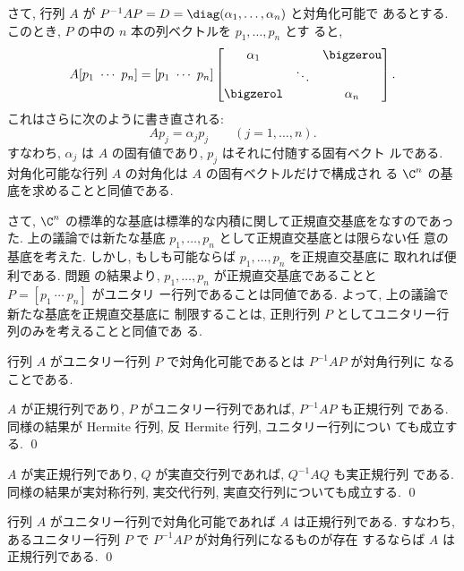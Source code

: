 \documentclass[12pt,twoside]{jarticle}
\begin{document}
さて, 行列 $A$ が $P^{-1}AP=D=\diag(\alpha_1,\dots,\alpha_n)$ と対角化可能で
あるとする.  このとき, $P$ の中の $n$ 本の列ベクトルを $p_1,\dots,p_n$ とす
ると, 
\begin{equation*}
  A [p_1\ \cdots\ p_n] = 
  [p_1\ \cdots\ p_n]
  \begin{bmatrix}
    \alpha_1  &        & \bigzerou \\
              & \ddots &           \\
    \bigzerol &        & \alpha_n  \\
  \end{bmatrix}.
\end{equation*}
これはさらに次のように書き直される:
\begin{equation*}
  A p_j = \alpha_j p_j \qquad (j=1,\dots,n).
\end{equation*}
すなわち, $\alpha_j$ は $A$ の固有値であり, $p_j$ はそれに付随する固有ベクト
ルである.  対角化可能な行列 $A$ の対角化は $A$ の固有ベクトルだけで構成され
る $\C^n$ の基底を求めることと同値である.  

さて, $\C^n$ の標準的な基底は標準的な内積に関して正規直交基底をなすのであっ
た.  上の議論では新たな基底 $p_1,\dots,p_n$ として正規直交基底とは限らない任
意の基底を考えた.  しかし, もしも可能ならば $p_1,\dots,p_n$ を正規直交基底に
取れれば便利である.  問題  の結果より, 
$p_1,\dots,p_n$ が正規直交基底であることと $P=[p_1\ \cdots\ p_n]$ がユニタリ
ー行列であることは同値である.  よって, 上の議論で新たな基底を正規直交基底に
制限することは, 正則行列 $P$ としてユニタリー行列のみを考えることと同値であ
る.

行列 $A$ がユニタリー行列 $P$ で対角化可能であるとは $P^{-1}AP$ が対角行列に
なることである.

\begin{question}[5点]
  $A$ が正規行列であり, $P$ がユニタリー行列であれば, $P^{-1}AP$ も正規行列
  である.  同様の結果が Hermite 行列, 反 Hermite 行列, ユニタリー行列につい
  ても成立する.
  \qed
\end{question}

\begin{question}[5点]
  $A$ が実正規行列であり, $Q$ が実直交行列であれば, $Q^{-1}AQ$ も実正規行列
  である.  同様の結果が実対称行列, 実交代行列, 実直交行列についても成立する.
  \qed
\end{question}

\begin{question}[5点]
\label{q:Toeplitz-easy}
  行列 $A$ がユニタリー行列で対角化可能であれば $A$ は正規行列である. 
  すなわち, あるユニタリー行列 $P$ で $P^{-1}AP$ が対角行列になるものが存在
  するならば $A$ は正規行列である.
  \qed
\end{question}
\end{document}
